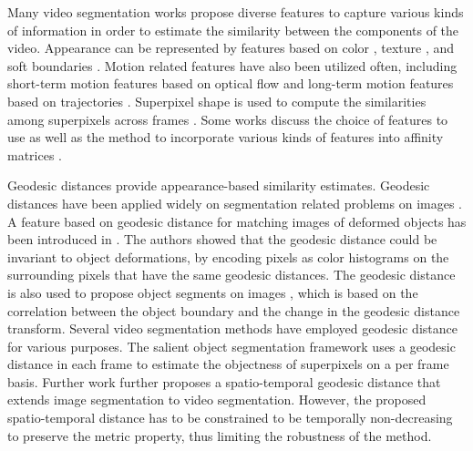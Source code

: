\documentclass[runningheads]{llncs}
\begin{document}
Many video segmentation works propose diverse features to capture various kinds of information in order to estimate the similarity between the components of the video. Appearance can be represented by features based on color \cite{Grundmann:5539893,Cheng:6247744}, texture \cite{textons}, and soft boundaries \cite{Galasso_2014_CVPR}. Motion related features have also been utilized often, including short-term motion features based on optical flow \cite{conf/iccv/GalassoINC11,Tsai_2016_CVPR} and long-term motion features based on trajectories \cite{Bro10c,track_to_the_future,cPalou13,Brox:2010:OSL:1888150.1888173}. Superpixel shape is used to compute the similarities among superpixels across frames \cite{Cheng:6247744}. Some works discuss the choice of features to use \cite{Galasso2013} as well as the method to incorporate various kinds of features into affinity matrices \cite{Khoreva:7298697}.
















Geodesic distances provide appearance-based similarity estimates. Geodesic distances have been applied widely on segmentation related problems on images \cite{Krähenbühl2014,geohis,Bai:4408931}. A feature based on geodesic distance for matching images of deformed objects has been introduced in \cite{geohis}. The authors showed that the geodesic distance could be invariant to object deformations, by encoding pixels as color histograms on the surrounding pixels that have the same geodesic distances. The geodesic distance is also used to propose object segments on images \cite{Krähenbühl2014}, which is based on the correlation between the object boundary and the change in the geodesic distance transform. 
Several video segmentation methods have employed geodesic distance for various purposes.
The salient object segmentation framework uses a geodesic distance in each frame to estimate the objectness of superpixels \cite{Wang:7298961} on a per frame basis. Further work further proposes a  spatio-temporal geodesic distance \cite{Bai:4408931} that extends image segmentation to video segmentation. However, the proposed spatio-temporal distance has to be constrained to be temporally non-decreasing to preserve the metric property, thus limiting the robustness of the method.
\end{document}
